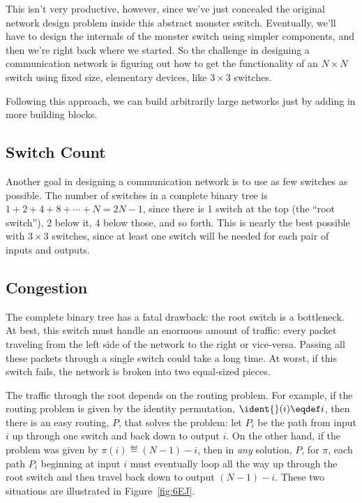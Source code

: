 This isn't very productive, however, since we've just concealed the
original network design problem inside this abstract monster switch.
Eventually, we'll have to design the internals of the monster switch
using simpler components, and then we're right back where we started.
So the challenge in designing a communication network is figuring out
how to get the functionality of an $N \times N$ switch using fixed
size, elementary devices, like $3 \times 3$ switches.
\begin{solution}
Following this approach, we can build arbitrarily large networks
just by adding in more building blocks.
\end{solution}

\subsection{Switch Count}

Another goal in designing a communication network is to use as few
switches as possible.  The number of switches in a complete binary
tree is $1 + 2 + 4 + 8 + \cdots + N = 2N - 1$, since there is 1 switch
at the top (the ``root switch''), 2 below it, 4 below those, and so
forth.  This is nearly the best possible with $3 \times 3$ switches,
since at least one switch will be needed for each pair of inputs and
outputs.

\subsection{Congestion}

The complete binary tree has a fatal drawback: the root switch is a
bottleneck.  At best, this switch must handle an enormous amount of
traffic: every packet traveling from the left side of the network to the
right or vice-versa.  Passing all these packets through a single switch
could take a long time.  At worst, if this switch fails, the network is
broken into two equal-sized pieces.

The traffic through the root depends on the routing problem.  For
example, if the routing problem is given by the identity permutation,
 $\ident{}(i) \eqdef i$, then
there is an easy routing, $P$, that solves the problem: let $P_i$ be
the path from input $i$ up through one switch and back down to output
$i$.  On the other hand, if the problem was given by $\pi(i) \eqdef (N
- 1) - i$, then in \emph{any} solution, $P$, for $\pi$, each path
$P_i$ beginning at input $i$ must eventually loop all the way up
through the root switch and then travel back down to output $(N - 1) -
i$.  These two situations are illustrated in Figure~\ref{fig:6EJ}.

